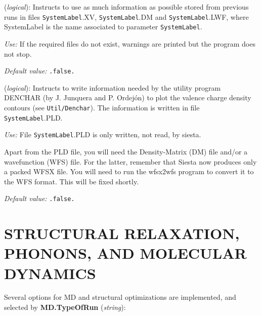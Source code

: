 \documentclass[11pt]{article}
\begin{document}
\begin{description}
\itemsep 10pt
\parsep 0pt


\item[{\bf UseSaveData}] ({\it logical}): 
Instructs to use as much information as possible stored from
previous runs in files {\tt SystemLabel}.XV, {\tt SystemLabel}.DM and
{\tt SystemLabel}.LWF, where SystemLabel is the name associated
to parameter {\tt SystemLabel}.

{\it Use:} If the required files do not exist, warnings are
printed but the program does not stop.

{\it Default value:} {\tt .false.}



 


\item[{\bf WriteDenchar}] ({\it logical}):
Instructs to write information needed by the utility program
DENCHAR (by J. Junquera and P. Ordej\'on) to plot the valence charge density
contours (see {\tt Util/Denchar}). The information is written in file {\tt SystemLabel}.PLD.
 
{\it Use:} File {\tt SystemLabel}.PLD is only written, not read, by siesta.
 
Apart from the PLD file, you will need the Density-Matrix (DM) file
and/or a wavefunction (WFS) file. For the latter, remember that Siesta
now produces only a packed WFSX file. You will need to run the
wfsx2wfs program to convert it to the WFS format. This will be fixed
shortly.

{\it Default value:} {\tt .false.}

\end{description}
        

\vspace{5pt}
\section{STRUCTURAL RELAXATION, PHONONS, AND MOLECULAR DYNAMICS}

Several options for MD and structural optimizations are 
implemented, and selected by 
{\bf MD.TypeOfRun} ({\it string}): 
\end{document}
